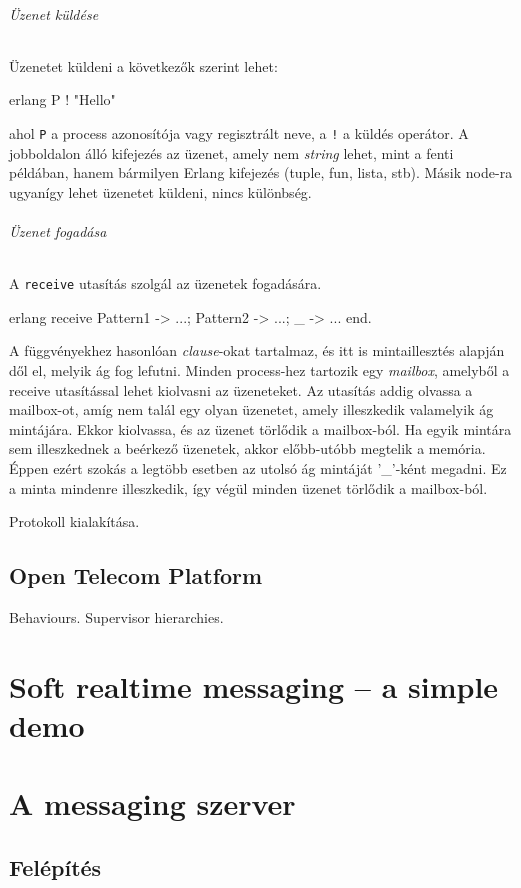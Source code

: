 \documentclass[12pt, a4paper, oneside]{book}
\begin{document}
\subparagraph{Üzenet küldése} Üzenetet küldeni a következők szerint lehet:
\begin{code}{erlang}{}
          P ! "Hello" 
\end{code} 
\noindent ahol \texttt{P} a process azonosítója vagy regisztrált
neve, a \texttt{!} a küldés operátor. A jobboldalon álló kifejezés az üzenet,
amely nem \emph{string} lehet, mint a fenti példában, hanem bármilyen Erlang
kifejezés (tuple, fun, lista, stb). Másik node-ra ugyanígy lehet üzenetet
küldeni, nincs különbség.

\subparagraph{Üzenet fogadása} A \texttt{receive} utasítás szolgál az üzenetek
fogadására. 
\begin{code}{erlang}{}
receive
  Pattern1 ->
        ...;
  Pattern2 ->
        ...;
  _ ->
        ...
end.
\end{code}

\noindent A függvényekhez hasonlóan \emph{clause}-okat tartalmaz, és itt is
mintaillesztés alapján dől el, melyik ág fog lefutni. Minden process-hez
tartozik egy \emph{mailbox}, amelyből a receive utasítással lehet kiolvasni az
üzeneteket. Az utasítás addig olvassa a mailbox-ot, amíg nem talál egy olyan
üzenetet, amely illeszkedik valamelyik ág mintájára. Ekkor kiolvassa, és az
üzenet törlődik a mailbox-ból. Ha egyik mintára sem illeszkednek a beérkező
üzenetek, akkor előbb-utóbb megtelik a memória. Éppen ezért szokás a legtöbb
esetben az utolsó ág mintáját '\_'-ként megadni. Ez a minta mindenre
illeszkedik, így végül minden üzenet törlődik a mailbox-ból. 

Protokoll kialakítása.


\newpage
\section{Open Telecom Platform} 
Behaviours. Supervisor hierarchies.  




\chapter{Soft realtime messaging -- a simple demo}

\chapter{A messaging szerver}
\section{Felépítés}
\end{document}

